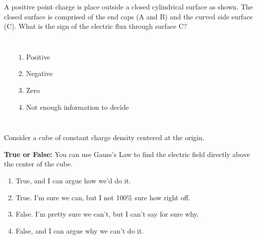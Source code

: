\documentclass[pdf,aspectratio=169]{beamer}
\begin{document}
\begin{frame}{}
	A positive point charge is place outside a closed cylindrical surface as shown. The closed surface is comprised of the end caps (A and B) and the curved side surface (C). What is the sign of the electric flux through surface C?
	\begin{columns}
		\begin{center}
		\end{center}
		\begin{enumerate}
			\item Positive
			\item \alert<2>{Negative}
			\item Zero
			\item Not enough information to decide
		\end{enumerate}
	\end{columns}
\end{frame}

\begin{frame}{}
	Consider a cube of constant charge density centered at the origin.

	\textbf{True or False:} You can use Gauss's Law to find the electric field directly above the center of the cube.

	\begin{enumerate}
		\item True, and I can argue how we'd do it.
		\item True. I'm sure we can, but I not 100\% sure how right off.
		\item False. I'm pretty sure we can't, but I can't say for sure why.
		\item \alert<2>{False, and I can argue why we can't do it.}
	\end{enumerate}
\end{frame}
\end{document}
